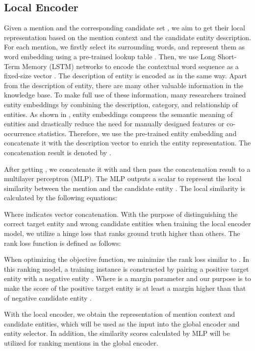 \documentclass[sigconf]{acmart}
\begin{document}
\subsection{Local Encoder}
Given a mention  and the corresponding candidate set , we aim to get their local representation based on the mention context and the candidate entity description. For each mention, we firstly select its  surrounding words, and represent them as word embedding using a pre-trained lookup table \cite{abs-1301-3781}. Then, we use Long Short-Term Memory (LSTM) networks to encode the contextual word sequence  as a fixed-size vector . The description of entity is encoded as  in the same way. Apart from the description of entity, there are many other valuable information in the knowledge base. To make full use of these information, many researchers trained entity embeddings by combining the description, category, and relationship of entities. As shown in \cite{GaneaH17}, entity embeddings compress the semantic meaning of entities and drastically reduce the need for manually designed features or co-occurrence statistics. Therefore, we use the pre-trained entity embedding  and concatenate it with the description vector  to enrich the entity representation. The concatenation result is denoted by .

After getting , we concatenate it with  and then pass the concatenation result to a multilayer perceptron (MLP). The MLP outputs a scalar to represent the local similarity between the mention  and the candidate entity . The local similarity is calculated by the following equations:


Where  indicates vector concatenation. With the purpose of distinguishing the correct target entity and wrong candidate entities when training the local encoder model, we utilize a hinge loss that ranks ground truth higher than others. The rank loss function is defined as follows:


When optimizing the objective function, we minimize the rank loss similar to \cite{GaneaH17, TitovL18a}. In this ranking model, a training instance is constructed by pairing a positive target entity  with a negative entity . Where  is a margin parameter and our purpose is to make the score of the positive target entity  is at least a margin  higher than that of negative candidate entity .

With the local encoder, we obtain the representation of mention context and candidate entities, which will be used as the input into the global encoder and entity selector. In addition, the similarity scores calculated by MLP will be utilized for ranking mentions in the global encoder.
\end{document}
